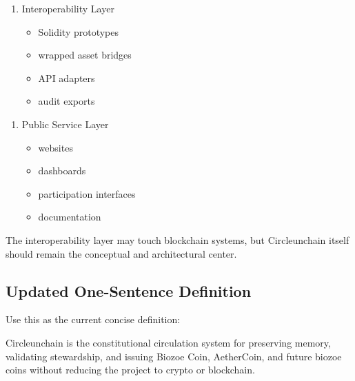 ﻿\documentclass[12pt]{article}
\begin{document}
\begin{enumerate}
  \item Interoperability Layer
\begin{itemize}
  \item Solidity prototypes
\end{itemize}
\begin{itemize}
  \item wrapped asset bridges
\end{itemize}
\begin{itemize}
  \item API adapters
\end{itemize}
\begin{itemize}
  \item audit exports
\end{itemize}
\end{enumerate}

\begin{enumerate}
  \item Public Service Layer
\begin{itemize}
  \item websites
\end{itemize}
\begin{itemize}
  \item dashboards
\end{itemize}
\begin{itemize}
  \item participation interfaces
\end{itemize}
\begin{itemize}
  \item documentation
\end{itemize}
\end{enumerate}

The interoperability layer may touch blockchain systems, but Circleunchain itself should remain the conceptual and architectural center.

\subsection{Updated One-Sentence Definition}


Use this as the current concise definition:

Circleunchain is the constitutional circulation system for preserving memory, validating stewardship, and issuing Biozoe Coin, AetherCoin, and future biozoe coins without reducing the project to crypto or blockchain.
\end{document}
